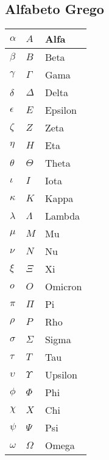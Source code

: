 \subsection{Alfabeto Grego}
    \begin{center}
        \begin{longtable}{| m{3cm} | m{3cm} | m{8.57cm} |}
            \hline $ \alpha $ & $ A $ & Alfa\\
            \hline $ \beta $ & $ B $ & Beta\\
            \hline $ \gamma $ & $ \Gamma $ & Gama\\
            \hline $ \delta $ & $ \Delta $ & Delta\\
            \hline $ \epsilon $ & $ E $ & Epsilon\\
            \hline $ \zeta $ & $ Z $ & Zeta\\
            \hline $ \eta $ & $ H $ & Eta\\
            \hline $ \theta $ & $ \Theta $ & Theta\\
            \hline $ \iota $ & $ I $ & Iota\\
            \hline $ \kappa $ & $ K $ & Kappa\\
            \hline $ \lambda $ & $ \Lambda $ & Lambda\\
            \hline $ \mu $ & $ M $ & Mu\\
            \hline $ \nu $ & $ N $ & Nu\\
            \hline $ \xi $ & $ \Xi $ & Xi\\
            \hline $ o $ & $ O $ & Omicron\\
            \hline $ \pi $ & $ \Pi $ & Pi\\
            \hline $ \rho $ & $ P $ & Rho\\
            \hline $ \sigma $ & $ \Sigma $ & Sigma\\
            \hline $ \tau $ & $ T $ & Tau\\
            \hline $ \upsilon $ & $ \Upsilon $ & Upsilon\\
            \hline $ \phi $ & $ \Phi $ & Phi\\
            \hline $ \chi $ & $ X $ & Chi\\
            \hline $ \psi $ & $ \Psi $ & Psi\\
            \hline $ \omega $ & $ \Omega $ & Omega\\
            \hline
        \end{longtable}
    \end{center}
